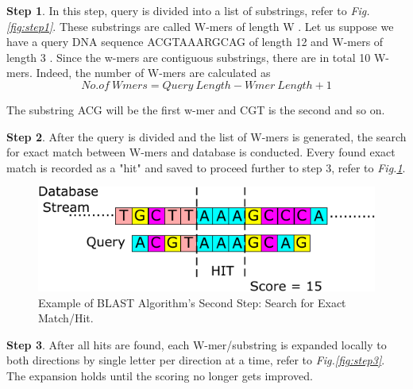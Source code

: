 \textbf{Step 1}. In this step, query is divided into a list of substrings, refer to \textit{Fig.\ref{fig:step1}}. These substrings are called W-mers of length W \cite{sotiriades2007design}. Let us suppose we have a query DNA sequence ACGTAAARGCAG of length 12 and W-mers of length 3 \cite{sotiriades2007design}. Since the w-mers are contiguous substrings, there are in total 10 W-mers. Indeed, the number of W-mers are calculated as 
\begin{equation}
\label{eq1}
No.of \ Wmers = Query \ Length - Wmer \ Length + 1 
\end{equation}

The substring ACG will be the first w-mer and CGT is the second and so on. 



\textbf{Step 2}. After the query is divided and the list of W-mers is generated, the search for exact match between W-mers and database is conducted. Every found exact match is recorded as a "hit" and saved to proceed further to step 3, refer to \textit{Fig.\ref{fig:step2}}. 

\begin{figure}[h!]
\centering
\includegraphics[width=\columnwidth]{Figures/Algorithm2.pdf}
\caption{Example of BLAST Algorithm's Second Step: Search for Exact Match/Hit.} \label{fig:step2}
\end{figure}



\textbf{Step 3}. After all hits are found, each W-mer/substring is expanded locally to both directions by single letter per direction at a time, refer to \textit{Fig.\ref{fig:step3}}. The expansion holds until the scoring no longer gets improved.
\\



